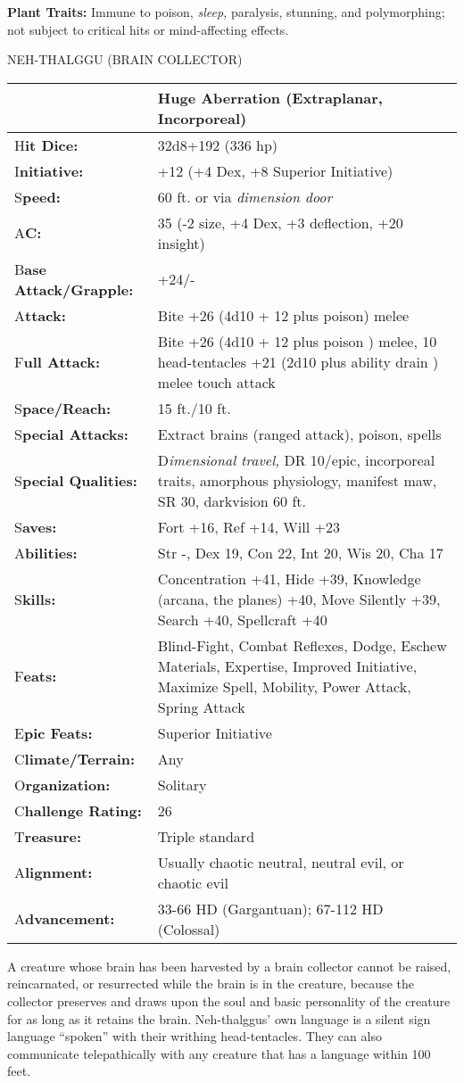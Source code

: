 \documentclass{article}
\begin{document}
{\textbf{Plant Traits:} Immune to poison, \textit{sleep, }paralysis, stunning, and 
polymorphing; not subject to critical hits or mind-affecting effects. 

\vspace{12pt}
{\LARGE{}NEH-THALGGU (BRAIN COLLECTOR) }

\begin{tabular}{|>{\raggedright}p{66pt}|>{\raggedright}p{259pt}|}
\hline
  & Huge Aberration (Extraplanar, Incorporeal) \tabularnewline
\hline
H\textbf{it Dice:} & 32d8+192 (336 hp) \tabularnewline
\hline
I\textbf{nitiative:} & +12 (+4 Dex, +8 Superior Initiative) \tabularnewline
\hline
S\textbf{peed:} & 60 ft. or via \textit{dimension door }\tabularnewline
\hline
A\textbf{C:} & 35 (-2 size, +4 Dex, +3 deflection, +20 insight) \tabularnewline
\hline
B\textbf{ase Attack/Grapple:} & +24/-\tabularnewline
\hline
A\textbf{ttack:} & Bite +26 (4d10 + 12 plus poison) melee\tabularnewline
\hline
F\textbf{ull Attack:} & Bite +26 (4d10 + 12 plus poison ) melee, 10 head-tentacles 
+21 (2d10 plus ability drain ) melee touch attack\tabularnewline
\hline
S\textbf{pace/Reach:} & 15 ft./10 ft. \tabularnewline
\hline
S\textbf{pecial Attacks:} & Extract brains (ranged attack), poison, spells \tabularnewline
\hline
S\textbf{pecial Qualities:} & D\textit{imensional travel, }DR 10/epic, incorporeal 
traits, amorphous physiology, manifest maw, SR 30, darkvision 60 ft.\tabularnewline
\hline
S\textbf{aves:} & Fort +16, Ref +14, Will +23 \tabularnewline
\hline
A\textbf{bilities:} & Str -, Dex 19, Con 22, Int 20, Wis 20, Cha 17 \tabularnewline
\hline
S\textbf{kills:} & Concentration +41, Hide +39, Knowledge (arcana, the planes) 
+40, Move Silently +39, Search +40, Spellcraft +40\tabularnewline
\hline
F\textbf{eats:} & Blind-Fight, Combat Reflexes, Dodge, Eschew Materials, Expertise, 
Improved Initiative, Maximize Spell, Mobility, Power Attack, Spring Attack \tabularnewline
\hline
E\textbf{pic Feats:} & Superior Initiative \tabularnewline
\hline
C\textbf{limate/Terrain:} & Any \tabularnewline
\hline
O\textbf{rganization:} & Solitary\tabularnewline
\hline
C\textbf{hallenge Rating:} & 26 \tabularnewline
\hline
T\textbf{reasure:} & Triple standard \tabularnewline
\hline
A\textbf{lignment:} & Usually chaotic neutral, neutral evil, or chaotic evil \tabularnewline
\hline
A\textbf{dvancement:} & 33-66 HD (Gargantuan); 67-112 HD (Colossal) \tabularnewline
\hline
\end{tabular}

A creature whose brain has been harvested by a brain collector cannot be raised, 
reincarnated, or resurrected while the brain is in the creature, because the collector 
preserves and draws upon the soul and basic personality of the creature for as 
long as it retains the brain. Neh-thalggus' own language is a silent sign language 
``spoken'' with their writhing head-tentacles. They can also communicate telepathically 
with any creature that has a language within 100 feet. 

}
\end{document}
